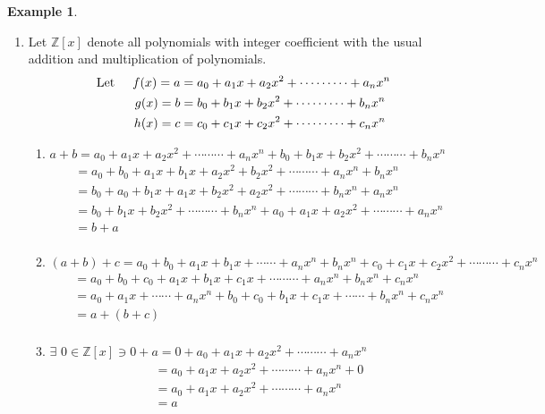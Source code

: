 \documentclass[11pt,a4paper]{article}
\theoremstyle{definition}
\newtheorem{exa}[thm]{Example}
\begin{document}
\begin{exa}
\begin{enumerate}
\item Let $\mathbb{Z}[x]$ denote all polynomials with integer coefficient with the usual addition and multiplication of polynomials.
\begin{align*}
\text{Let}\hspace{0.5cm} f(x) = a & = a_0 + a_1x + a_2x^2 + \cdots\cdots\cdots + a_nx^n\\
g(x) = b & = b_0 + b_1x + b_2x^2 + \cdots\cdots\cdots + b_nx^n\\
h(x) = c & = c_0 + c_1x + c_2x^2 + \cdots\cdots\cdots + c_nx^n\\
\end{align*}
\begin{enumerate}
    \item[(i)] $a + b = a_0 + a_1x + a_2x^2 + \cdots\cdots\cdots + a_nx^n + b_0 + b_1x + b_2x^2 + \cdots\cdots\cdots + b_nx^n$
     \begin{align*}
      & = a_0 + b_0 + a_1 x + b_1 x + a_2 x^2 + b_2 x^2 +\cdots\cdots\cdots + a_n x^n + b_n x^n\\
      & = b_0 + a_0 + b_1 x + a_1 x + b_2 x^2 + a_2 x^2 + \cdots\cdots\cdots + b_n x^n + a_n x^n\\
      & = b_0 + b_1x + b_2x^2 + \cdots\cdots\cdots + b_nx^n + a_0 + a_1x + a_2x^2 + \cdots\cdots\cdots + a_nx^n\\
      & = b + a\\
     \end{align*}
     
     
     \item[(ii)] $(a + b) + c  = a_0 + b_0 + a_1 x + b_1 x  + \cdots\cdots + a_nx^n + b_n x^n + c_0 + c_1x + c_2x^2 + \cdots\cdots\cdots + c_nx^n$
     \begin{align*}
     & = a_0 + b_0 + c_0 + a_1 x + b_1 x + c_1 x + \cdots\cdots\cdots + a_n x^n + b_n x^n + c_n x^n\\
     & = a_0 + a_1x + \cdots\cdots + a_n x^n + b_0 + c_0 + b_1 x + c_1 x + \cdots\cdots + b_n x^n + c_n x^n\\
     & = a + (b + c)\\
     \end{align*}
     
     
     \item[(iii)] $\exists\,\, 0\in \mathbb{Z}[x]\ni 0 + a = 0 + a_0 + a_1x + a_2x^2 + \cdots\cdots\cdots + a_nx^n$
     \begin{align*}
     & = a_0 + a_1x + a_2x^2 + \cdots\cdots\cdots + a_nx^n + 0\\
     & = a_0 + a_1x + a_2x^2 + \cdots\cdots\cdots + a_nx^n\\
     & = a\\
     \end{align*}
     

\end{enumerate}
\end{enumerate}
\end{exa}
\end{document}

